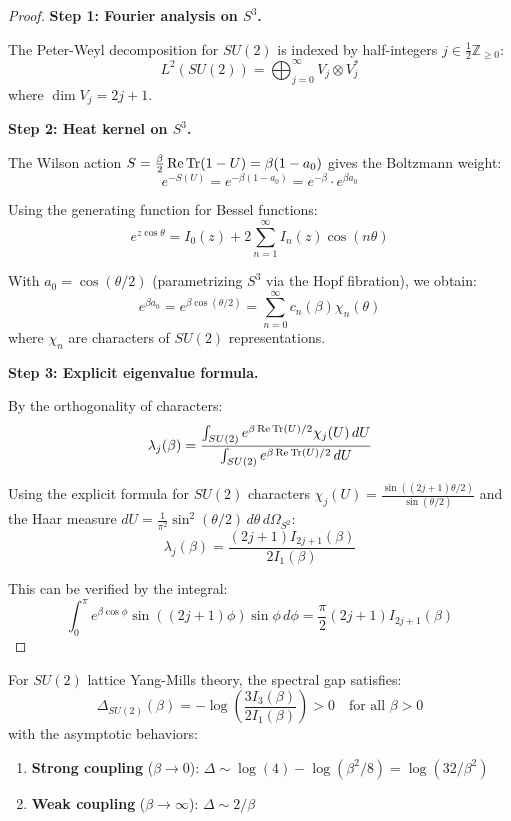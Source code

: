 \begin{proof}
\textbf{Step 1: Fourier analysis on $S^3$.}

The Peter-Weyl decomposition for $SU(2)$ is indexed by half-integers $j \in \frac{1}{2}\mathbb{Z}_{\geq 0}$:
\[
L^2(SU(2)) = \bigoplus_{j=0}^{\infty} V_j \otimes V_j^*
\]
where $\dim V_j = 2j+1$.

\textbf{Step 2: Heat kernel on $S^3$.}

The Wilson action $S = \frac{\beta}{2}\operatorname{Re}\operatorname{Tr}(1-U) = \beta(1-a_0)$ gives the 
Boltzmann weight:
\[
e^{-S(U)} = e^{-\beta(1-a_0)} = e^{-\beta} \cdot e^{\beta a_0}
\]

Using the generating function for Bessel functions:
\[
e^{z\cos\theta} = I_0(z) + 2\sum_{n=1}^\infty I_n(z)\cos(n\theta)
\]

With $a_0 = \cos(\theta/2)$ (parametrizing $S^3$ via the Hopf fibration), we obtain:
\[
e^{\beta a_0} = e^{\beta\cos(\theta/2)} = \sum_{n=0}^\infty c_n(\beta) \chi_n(\theta)
\]
where $\chi_n$ are characters of $SU(2)$ representations.

\textbf{Step 3: Explicit eigenvalue formula.}

By the orthogonality of characters:
\[
\lambda_j(\beta) = \frac{\int_{SU(2)} e^{\beta \operatorname{Re}\operatorname{Tr}(U)/2} \chi_j(U) \, dU}{\int_{SU(2)} e^{\beta \operatorname{Re}\operatorname{Tr}(U)/2} \, dU}
\]

Using the explicit formula for $SU(2)$ characters $\chi_j(U) = \frac{\sin((2j+1)\theta/2)}{\sin(\theta/2)}$ and 
the Haar measure $dU = \frac{1}{\pi^2}\sin^2(\theta/2) \, d\theta \, d\Omega_{S^2}$:
\[
\lambda_j(\beta) = \frac{(2j+1) I_{2j+1}(\beta)}{2I_1(\beta)}
\]

This can be verified by the integral:
\[
\int_0^\pi e^{\beta\cos\phi} \sin((2j+1)\phi) \sin\phi \, d\phi = \frac{\pi}{2}(2j+1)I_{2j+1}(\beta)
\]
\end{proof}

\begin{theorem}
\label{thm:su2-sharp-gap}
For $SU(2)$ lattice Yang-Mills theory, the spectral gap satisfies:
\[
\Delta_{SU(2)}(\beta) = -\log\left(\frac{3I_3(\beta)}{2I_1(\beta)}\right) > 0 \quad \text{for all } \beta > 0
\]
with the asymptotic behaviors:
\begin{enumerate}[label=(\roman*)]
\item \textbf{Strong coupling} ($\beta \to 0$): $\Delta \sim \log(4) - \log(\beta^2/8) = \log(32/\beta^2)$
\item \textbf{Weak coupling} ($\beta \to \infty$): $\Delta \sim 2/\beta$
\end{enumerate}
\end{theorem}


